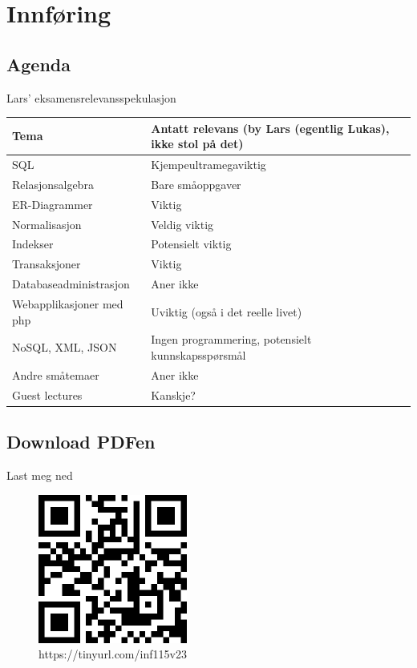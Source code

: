 
\begin{frame}[t,plain]
    \titlepage
\end{frame}

\section{Innføring}
\subsection*{Agenda}
\begin{frame}
    \tableofcontents
\end{frame}

\begin{frame}{Lars' eksamensrelevansspekulasjon}
    \begin{tabular}{l|l}
    Tema & Antatt relevans (by Lars (egentlig Lukas), ikke stol på det)\\\hline\pause
    SQL & Kjempeultramegaviktig\\\pause
    Relasjonsalgebra & Bare småoppgaver\\\pause
    ER-Diagrammer & Viktig\\\pause
    Normalisasjon & Veldig viktig\\\pause
    Indekser & Potensielt viktig\\\pause
    Transaksjoner & Viktig\\\pause
    Databaseadministrasjon & Aner ikke\\\pause
    Webapplikasjoner med php & Uviktig (også i det reelle livet)\\\pause
    NoSQL, XML, JSON & Ingen programmering, potensielt kunnskapsspørsmål\\\pause
    Andre småtemaer & Aner ikke\\\pause
    Guest lectures & Kanskje?
    \end{tabular}
\end{frame}

\subsection*{Download PDFen}
\begin{frame}{Last meg ned}
    \begin{figure}
        \centering
        \includegraphics[height = 4.9cm]{images/downloadqr.png}
        \caption{https://tinyurl.com/inf115v23}
        \label{fig:qrcode}
    \end{figure}
\end{frame}

